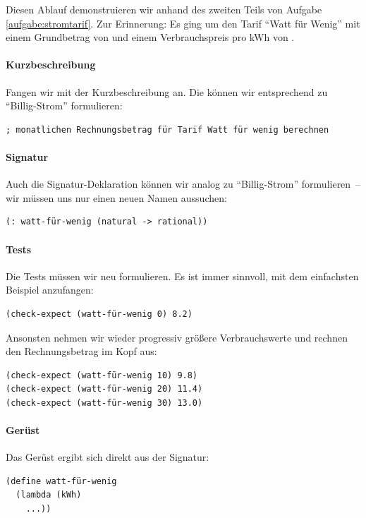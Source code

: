 Diesen Ablauf demonstruieren wir anhand des zweiten Teils von Aufgabe~
\ref{aufgabe:stromtarif}.  Zur Erinnerung:  Es ging um den Tarif
"`Watt für Wenig"' mit einem Grundbetrag von  und einem
Verbrauchspreis pro kWh von .

\paragraph{Kurzbeschreibung}

Fangen wir mit der Kurzbeschreibung an.  Die können wir entsprechend
zu "`Billig-Strom"' formulieren:
\begin{verbatim}
; monatlichen Rechnungsbetrag für Tarif Watt für wenig berechnen
\end{verbatim}

\paragraph{Signatur}

Auch die Signatur-Deklaration können wir analog zu "`Billig-Strom"'
formulieren~-- wir müssen uns nur einen neuen Namen aussuchen:
%
\begin{verbatim}
(: watt-für-wenig (natural -> rational))
\end{verbatim}

\paragraph{Tests}

Die Tests müssen wir neu formulieren.  Es ist immer sinnvoll, mit dem
einfachsten Beispiel anzufangen:
\begin{verbatim}
(check-expect (watt-für-wenig 0) 8.2)
\end{verbatim}

Ansonsten nehmen wir wieder progressiv größere Verbrauchswerte und
rechnen den Rechnungsbetrag im Kopf aus:
%
\begin{verbatim}
(check-expect (watt-für-wenig 10) 9.8)
(check-expect (watt-für-wenig 20) 11.4)
(check-expect (watt-für-wenig 30) 13.0)
\end{verbatim}

\paragraph{Gerüst}

Das Gerüst ergibt sich direkt aus der Signatur:
%
\begin{verbatim}
(define watt-für-wenig
  (lambda (kWh)
    ...))
\end{verbatim}

